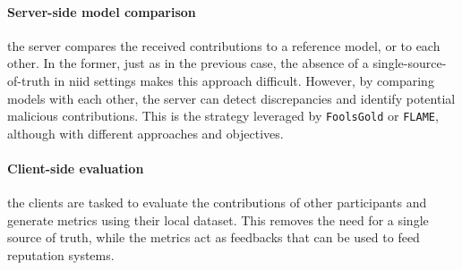 \documentclass[conference]{IEEEtran}
\begin{document}
\paragraph*{Server-side model comparison} the server compares the received contributions to a reference model, or to each other.
In the former, just as in the previous case, the absence of a single-source-of-truth in \gls{niid} settings makes this approach difficult.
However, by comparing models with each other, the server can detect discrepancies and identify potential malicious contributions.
This is the strategy leveraged by \texttt{FoolsGold} or \texttt{FLAME}, although with different approaches and objectives.

\paragraph*{Client-side evaluation} the clients are tasked to evaluate the contributions of other participants and generate metrics using their local dataset.
This removes the need for a single source of truth, while the metrics act as feedbacks that can be used to feed reputation systems.

\printbibliography




\end{document}
